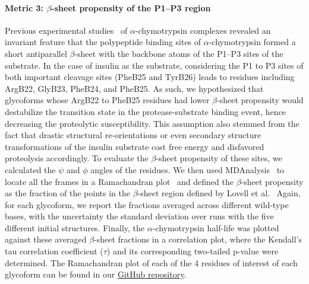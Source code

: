 \documentclass[9pt]{elife}
\begin{document}
\paragraph{Metric 3: $\beta$-sheet propensity of the P1--P3 region}
Previous experimental studies~\cite{bode1993natural,hedstrom2002serine,coombs1999revisiting} of $\alpha$-chymotrypsin complexes revealed an invariant feature that the polypeptide binding sites of $\alpha$-chymotrypsin formed a short antiparallel $\beta$-sheet with the backbone atoms of the P1--P3 sites of the substrate. In the case of insulin as the substrate, considering the P1 to P3 sites of both important cleavage sites (PheB25 and TyrB26) leads to residues including ArgB22, GlyB23, PheB24, and PheB25. As such, we hypothesized that glycoforms whose ArgB22 to PheB25 residues had lower $\beta$-sheet propensity would destabilize the transition state in the protease-substrate binding event, hence decreasing the proteolytic susceptibility. This assumption also stemmed from the fact that drastic structural re-orientations or even secondary structure transformations of the insulin substrate cost free energy and disfavored proteolysis accordingly. To evaluate the $\beta$-sheet propensity of these sites, we calculated the $\psi$ and $\phi$ angles of the residues. We then used MDAnalysis~\cite{gowers2019mdanalysis, michaud2011mdanalysis} to locate all the frames in a Ramachandran plot~\cite{ramachandran1963stereochemistry} and defined the $\beta$-sheet propensity as the fraction of the points in the $\beta$-sheet region defined by Lovell et al.~\cite{lovell2003structure} Again, for each glycoform, we report the fractions averaged across different wild-type bases, with the uncertainty the standard deviation over runs with the five different initial structures. Finally, the $\alpha$-chymotrypsin half-life was plotted against these averaged $\beta$-sheet fractions in a correlation plot, where the Kendall's tau correlation coefficient ($\tau$) and its corresponding two-tailed p-value were determined. The Ramachandran plot of each of the 4 residues of interest of each glycoform can be found in our \href{https://github.com/shirtsgroup/Glycoinsulin_project}{GitHub repository}.
\end{document}
